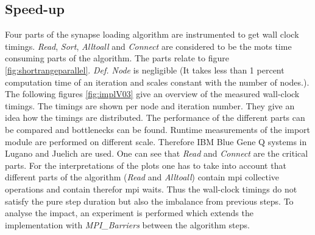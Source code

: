 \subsection{Speed-up}
Four parts of the synapse loading algorithm are instrumented to get wall clock timings.
\emph{Read}, \emph{Sort}, \emph{Alltoall} and \emph{Connect} are considered to be the mots time
consuming parts of the algorithm. The parts relate to figure \ref{fig:shortrangeparallel}.
\emph{Def. Node} is negligible (It takes less than 1 percent computation time of an iteration and scales constant with the number of nodes.).
The following figures \ref{fig:implV03} give an overview of the measured wall-clock timings.
The timings are shown per node and iteration number. They give an idea how the timings are distributed.
The performance of the different parts can be compared and bottlenecks can be found.
Runtime measurements of the import module are performed on different scale.
Therefore IBM Blue Gene Q systems in Lugano and Juelich are used.
One can see that \emph{Read} and \emph{Connect} are the critical parts.
For the interpretations of the plots one has to take into account that different parts of the algorithm
(\emph{Read} and \emph{Alltoall}) contain mpi collective operations and contain therefor mpi waits.
Thus the wall-clock timings do not satisfy the pure step duration but also the imbalance from previous steps.
To analyse the impact, an experiment is performed which extends the implementation with \emph{MPI\_Barriers}
between the algorithm steps.
\newpage
